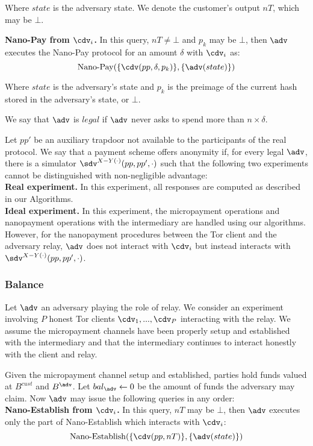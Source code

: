 Where $state$ is the adversary state.
We denote the customer's output $nT$, which may be $\bot$.

\textbf{Nano-Pay from $\cdv_i$.}
In this query, $nT \neq \bot$ and $p_k$ may be $\bot$, then $\adv$ executes the Nano-Pay protocol for an amount $\delta$ with $\cdv_i$ as: $$\operatorname{Nano-Pay}(\{\cdv(pp, \delta, p_k)\}, \{\adv(state)\})$$

Where $state$ is the adversary's state and $p_k$ is the preimage of the current hash stored in the adversary's state, or $\bot$.

We say that $\adv$ is $legal$ if $\adv$ never asks to spend more than $n \times \delta$.

Let $pp'$ be an auxiliary trapdoor not available to the participants of the real protocol.
We say that a payment scheme offers anonymity if, for every legal $\adv$, there is a simulator $\sdv^{X-Y(\cdot)}(pp, pp', \cdot)$ such that the following two experiments cannot be distinguished with non-negligible advantage:\\ \textbf{Real experiment.}
In this experiment, all responses are computed as described in our Algorithms.\\ \textbf{Ideal experiment.}
In this experiment, the micropayment operations and nanopayment operations with the intermediary are handled using our algorithms.
However, for the nanopayment procedures between the Tor client and the adversary relay, $\adv$ does not interact with $\cdv_i$ but instead interacts with $\sdv^{X-Y(\cdot)}(pp,pp',\cdot)$.

\subsubsection{Balance}
\label{def:balance}

Let $\adv$ an adversary playing the role of relay.
We consider an experiment involving $P$ honest Tor clients $\cdv_1,..., \cdv_P$ interacting with the relay.
We assume the micropayment channels have been properly setup and established with the intermediary and that the intermediary continues to interact honestly with the client and relay.

Given the micropayment channel setup and established, parties hold funds valued at $B^{cust}$ and $B^{\adv}$.
Let $bal_\adv \leftarrow 0$ be the amount of funds the adversary may claim.
Now $\adv$ may issue the following queries in any order:\\

\textbf{Nano-Establish from $\cdv_i$.}
In this query, $nT$ may be $\bot$, then $\adv$ executes only the part of Nano-Establish which interacts with $\cdv_i$: $$\operatorname{Nano-Establish}(\{\cdv(pp, nT)\}, \{\adv(state)\})$$

